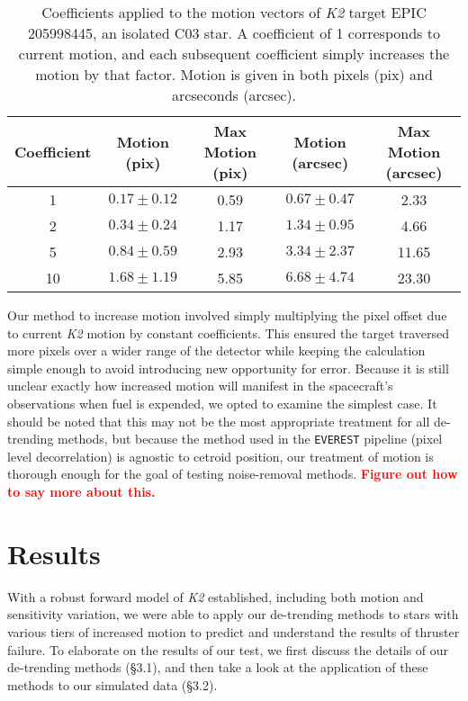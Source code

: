 \documentclass[12pt,preprint]{aastex}
\begin{document}
\begin{table}[h!]
\begin{center}
    \begin{tabular}{c | c | c | c | c}
        Coefficient & Motion (pix) & Max Motion (pix) & Motion (arcsec) & Max Motion (arcsec) \\
        \hline \hline
        1 & $0.17\pm0.12$ & 0.59 & $0.67\pm0.47$ & 2.33 \\
        2 & $0.34\pm0.24$ & 1.17 & $1.34\pm0.95$ & 4.66 \\
				5 & $0.84\pm0.59$ & 2.93 & $3.34\pm2.37$ & 11.65 \\
				10 & $1.68\pm1.19$ & 5.85 & $6.68\pm4.74$ & 23.30 \\
   \end{tabular}
	 \caption{Coefficients applied to the motion vectors of \textit{K2} target EPIC 205998445, an isolated C03 star. A coefficient of 1 corresponds to current motion, and each subsequent coefficient simply increases the motion by that factor. Motion is given in both pixels (pix) and arcseconds (arcsec).}
	 \label{table:motionstatistics}
\end{center}
\end{table}

Our method to increase motion involved simply multiplying the pixel offset due to current \textit{K2} motion by constant coefficients. This ensured the target traversed more pixels over a wider range of the detector while keeping the calculation simple enough to avoid introducing new opportunity for error. Because it is still unclear exactly how increased motion will manifest in the spacecraft's observations when fuel is expended, we opted to examine the simplest case. It should be noted that this may not be the most appropriate treatment for all de-trending methods, but because the method used in the \texttt{EVEREST} pipeline (pixel level decorrelation) is agnostic to cetroid position, our treatment of motion is thorough enough for the goal of testing noise-removal methods. \textcolor{red}{\textbf{Figure out how to say more about this.}}

\section{Results}

With a robust forward model of \textit{K2} established, including both motion and sensitivity variation, we were able to apply our de-trending methods to stars with various tiers of increased motion to predict and understand the results of thruster failure. To elaborate on the results of our test, we first discuss the details of our de-trending methods (\S 3.1), and then take a look at the application of these methods to our simulated data (\S 3.2).
\end{document}
